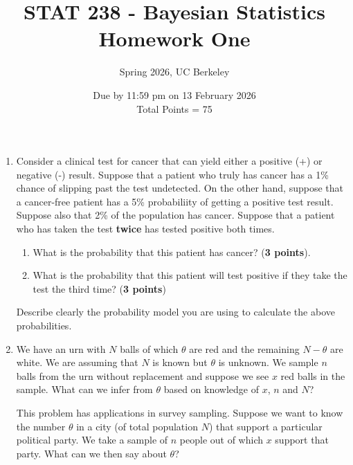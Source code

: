 \documentclass{scrartcl}
\begin{document}
\title{STAT 238 - Bayesian Statistics \\
 Homework One} 
\subtitle{Spring 2026, UC Berkeley}
\author{Due by 11:59 pm on 13 February 2026 \\ Total Points = 75} 

\date{}
\maketitle




\begin{enumerate}

\item    Consider a clinical test for cancer that can yield either a
  positive (+)  
  or negative (-) result. Suppose that a patient who truly has cancer
  has a 1\% chance of slipping past the test undetected. On the other
  hand, suppose that a cancer-free patient has a 5\% probabiliity of
  getting a positive test result. Suppose also that 2\% of the
  population has cancer. Suppose that a patient who has taken the test
  \textbf{twice} has tested positive both times. 
  \begin{enumerate}
  \item What is the probability that this patient has cancer?
    (\textbf{3 points}). 
  \item What is the probability that this patient will test positive
    if they take the test the third time? (\textbf{3 points})
  \end{enumerate}
  Describe clearly the probability model you are using to
  calculate the above probabilities.

\item We have an urn with $N$ balls of which $\theta$ are red and the
  remaining $N - \theta$ are white. We are assuming that $N$ is known
  but $\theta$ is unknown. We sample $n$ balls from the urn without
  replacement and suppose we see $x$ red balls in the sample. What can
  we infer from $\theta$ based on knowledge of $x$, $n$ and $N$?

  This problem has applications in survey sampling. Suppose we want to
  know the number $\theta$ in a city (of total population $N$) that
  support a particular political party. We take a sample of $n$ people
  out of which $x$ support that party. What can we then say about
  $\theta$?


\end{enumerate}
\end{document}

